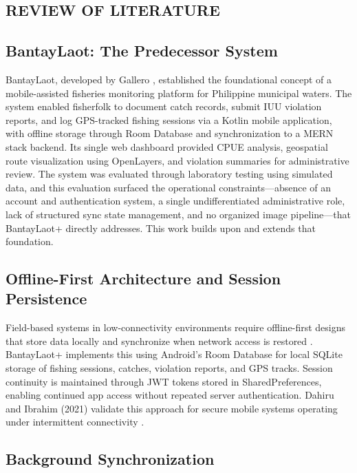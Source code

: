 \documentclass{icsthesis}
\begin{document}
\begin{mainmatter}
		\section{REVIEW OF LITERATURE}
			\subsection{BantayLaot: The Predecessor System}

BantayLaot, developed by Gallero \cite{Gallero2025}, established the foundational
concept of a mobile-assisted fisheries monitoring platform for Philippine municipal
waters. The system enabled fisherfolk to document catch records, submit IUU violation
reports, and log GPS-tracked fishing sessions via a Kotlin mobile application, with
offline storage through Room Database and synchronization to a MERN stack backend.
Its single web dashboard provided CPUE analysis, geospatial route visualization using
OpenLayers, and violation summaries for administrative review. The system was evaluated
through laboratory testing using simulated data, and this evaluation surfaced the
operational constraints---absence of an account and authentication system, a single
undifferentiated administrative role, lack of structured sync state management, and no
organized image pipeline---that BantayLaot+ directly addresses. This work builds upon
and extends that foundation.

\subsection{Offline-First Architecture and Session Persistence}

Field-based systems in low-connectivity environments require offline-first designs that
store data locally and synchronize when network access is restored \cite{Serrano2020}.
BantayLaot+ implements this using Android's Room Database for local SQLite storage of
fishing sessions, catches, violation reports, and GPS tracks. Session continuity is maintained through JWT tokens stored in SharedPreferences,
enabling continued app access without repeated server authentication. Dahiru and Ibrahim (2021) validate this
approach for secure mobile systems operating under intermittent connectivity
\cite{Dahiru2021}.

\subsection{Background Synchronization}


\end{mainmatter}
\end{document}
